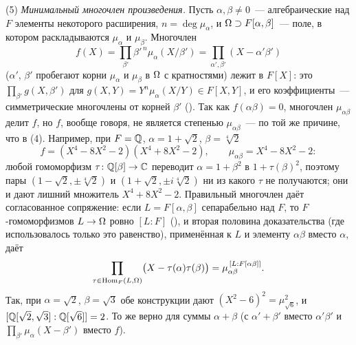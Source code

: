 \begin{remark}[3.15d]
(5) \emph{Минимальный многочлен произведения.} Пусть $\alpha,\beta\ne0$~--- алгебраические над $F$ элементы некоторого
расширения, $n=\deg\mu_\alpha$, и $\Omega\supset F[\alpha,\beta]$~--- поле, в котором раскладываются $\mu_\alpha$ и $\mu_\beta$. Многочлен
\[
f(X)=\prod_{\beta'}\beta'^{\,n}\mu_\alpha(X/\beta')=\prod_{\alpha',\beta'}(X-\alpha'\beta')
\]
($\alpha'$, $\beta'$ пробегают корни $\mu_\alpha$ и $\mu_\beta$ в $\Omega$ с кратностями) лежит в $F[X]$: это
$\prod_{\beta'}g(X,\beta')$ для $g(X,Y)=Y^n\mu_\alpha(X/Y)\in F[X,Y]$, и его коэффициенты~--- симметрические многочлены от
корней $\beta'$ (). Так как $f(\alpha\beta)=0$, многочлен $\mu_{\alpha\beta}$ делит $f$, но $f$, вообще говоря, не
является степенью $\mu_{\alpha\beta}$~--- по той же причине, что в (4). Например, при $F=\mathbb Q$, $\alpha=1+\sqrt2$, $\beta=\sqrt[4]2$
\[
f=(X^4-8X^2-2)(X^4+8X^2-2),\qquad \mu_{\alpha\beta}=X^4-8X^2-2:
\]
любой гомоморфизм $\tau\colon\mathbb Q[\beta]\to\mathbb C$ переводит $\alpha=1+\beta^2$ в $1+\tau(\beta)^2$, поэтому пары
$(1-\sqrt2,\pm\sqrt[4]2)$ и $(1+\sqrt2,\pm i\sqrt[4]2)$ ни из какого $\tau$ не получаются; они и дают лишний множитель
$X^4+8X^2-2$. Правильный многочлен даёт согласованное сопряжение: если $L=F[\alpha,\beta]$ сепарабельно над $F$, то
$F$-гомоморфизмов $L\to\Omega$ ровно $[L:F]$ (), и вторая половина доказательства  (где использовалось только
это равенство), применённая к $L$ и элементу $\alpha\beta$ вместо $\alpha$, даёт
\[
\prod_{\tau\in\operatorname{Hom}_F(L,\Omega)}\bigl(X-\tau(\alpha)\tau(\beta)\bigr)=\mu_{\alpha\beta}^{\,[L:F[\alpha\beta]]}.
\]
Так, при $\alpha=\sqrt2$, $\beta=\sqrt3$ обе конструкции дают $(X^2-6)^2=\mu_{\sqrt6}^2$, и $[\mathbb Q[\sqrt2,\sqrt3]:\mathbb Q[\sqrt6]]=2$.
То же верно для суммы $\alpha+\beta$ (с $\alpha'+\beta'$ вместо $\alpha'\beta'$ и $\prod_{\beta'}\mu_\alpha(X-\beta')$ вместо $f$).
\end{remark}

